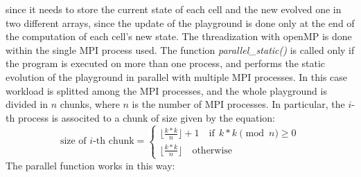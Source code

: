 \documentclass[12pt, titlepage]{report}
\begin{document}
since it needs to store the current state of each cell and the new evolved one in two different arrays, since the update of the playground
is done only at the end of the computation of each cell's new state. The threadization with openMP is done within the single MPI process used. 
The function \emph{parallel\_static()} is called only if the program is executed on more than one process, and performs the static evolution of the playground 
in parallel with multiple MPI processes. In this case workload is splitted among the MPI processes, and the whole playground is divided in $n$ chunks,
where $n$ is the number of MPI processes. In particular, the $i$-th process is associted to a chunk of size given by the equation:
\begin{equation}
	\text{size of $i$-th chunk}	= 
		\begin{cases}
			\lfloor{\frac{k*k}{n}}\rfloor + 1 \quad \text{if} \ \ k*k \pmod{n} \geq 0 \\
			\lfloor{\frac{k*k}{n}}\rfloor \quad \text{otherwise}
		\end{cases}
\end{equation}
The parallel function works in this way:
\end{document}
